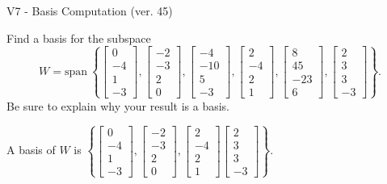 \begin{exercise}
  \begin{exerciseTitle}V7 - Basis Computation (ver. 45)\end{exerciseTitle}
  \begin{exerciseStatement}
    Find a basis for the subspace 
\[W=\mathrm{span}\ \left\{\left[\begin{array}{r}
0 \\
-4 \\
1 \\
-3
\end{array}\right] , \left[\begin{array}{r}
-2 \\
-3 \\
2 \\
0
\end{array}\right] , \left[\begin{array}{r}
-4 \\
-10 \\
5 \\
-3
\end{array}\right] , \left[\begin{array}{r}
2 \\
-4 \\
2 \\
1
\end{array}\right] , \left[\begin{array}{r}
8 \\
45 \\
-23 \\
6
\end{array}\right] , \left[\begin{array}{r}
2 \\
3 \\
3 \\
-3
\end{array}\right]\right\}.\]
 Be sure to explain why your result is a basis.


  \end{exerciseStatement}
  \begin{exerciseAnswer}
   A basis of \(W\) is  \(\left\{\left[\begin{array}{r}
0 \\
-4 \\
1 \\
-3
\end{array}\right] , \left[\begin{array}{r}
-2 \\
-3 \\
2 \\
0
\end{array}\right] , \left[\begin{array}{r}
2 \\
-4 \\
2 \\
1
\end{array}\right] \left[\begin{array}{r}
2 \\
3 \\
3 \\
-3
\end{array}\right]\right\}\).
  


  \end{exerciseAnswer}
\end{exercise}